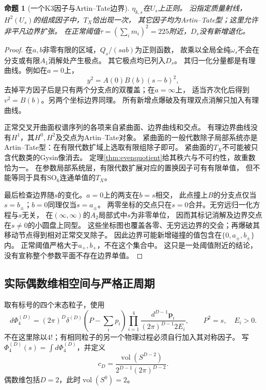 \documentclass[11pt,a4paper]{ctexart}
\theoremstyle{cnplain}\newtheorem{theorem}{定理}[section]
\newtheorem{proposition}[theorem]{命题}
\theoremstyle{definition}\newtheorem{definition}[theorem]{定义}
\theoremstyle{remark}\newtheorem{remark}[theorem]{注}
\begin{document}
\begin{proposition}[一个K3因子与Artin--Tate边界]\label{prop:evenboundary}
$\eta_{k,s}$在$U_s$上正则。
沿指定质量射线，$H^2(U_s)$的组成因子中，$T_X$恰出现一次，
其它因子均为Artin--Tate型；这里允许非平凡边界扩张。
在正常阈值$\tau=(\sum_i m_i)^2=225$附近，$D_s$没有新增退化。
\end{proposition}
\begin{proof}
在$a,b$非零有限的区域，$Q_s/(sab)$为正则函数，
故乘以全局全纯$\omega_s$不会在分支或有限$A_1$消解处产生极点。
其它极点均已列入$D_s$。
其归一化分量都是有理曲线。例如在$a=0$上，
\[
 y^2=A(0)B(b)(s-b)^2,
\]
去掉平方因子后是只有两个分支点的双覆盖；在$a=\infty$上，
适当齐次化后得到$v^2=B(b)$。另两个坐标边界同理。
所有新增点爆破及有理双点消解只加入有理曲线。

正常交叉开曲面权谱序列的各项来自紧曲面、边界曲线和交点。
有理边界曲线没有$H^1$，其$H^0,H^2$及交点为Artin--Tate对象。
紧曲面的一般代数除子局部系统亦是Artin--Tate型：在有限代数扩域上选取有限组除子即可。
紧曲面的$T_X$不可能被只含代数类的Gysin像消去。
定理\ref{thm:evenquotient}给其秩六与不可约性，故重数恰为一。
在参数局部系统层，有限代数扩展对应的置换因子可有有限单值，
但不能等同于具有$\mathrm{SO}_6$连通单值的$T_X$。

最后检查边界随$s$的变化。$a=0$上的两支在$b=s$相交，
此点撞上$B$的分支点仅当$s=b_\pm$；$b=0$同理仅当$s=a_\pm$。
两零坐标的交点只在$s=0$合并。无穷远归一化方程与$s$无关，
在$(\infty,\infty)$的$A_2$局部式中$s$为非零单位，
因而其标记消解及边界交点在$s\ne0$的小圆盘上同型。
这些坐标图也覆盖各零、无穷远边界的交会；再爆破其移动节点得到相对正常交叉除子。
因此边界可能新增碰撞的值包含在$\{0,a_\pm,b_\pm\}$内。
正常阈值严格大于$a_+,b_+$，不在这个集合中。
这只是一处阈值附近的结论，没有宣称整个参数平面不存在边界单值。
\end{proof}

\subsection{实际偶数维相空间与严格正周期}
取有标号的四个末态粒子，使用
\[
 d\Phi_4^{(D)}=(2\pi)^D\delta^{(D)}(P-\textstyle\sum_i p_i)
       \prod_{i=1}^4\frac{d^{D-1}\mathbf p_i}{(2\pi)^{D-1}2E_i},
 \qquad P^2=s,\quad E_i>0.
\]
不在这里除以$4!$；有相同粒子的另一个物理过程必须自行加入其对称因子。
写$\Phi_4^{(D)}(s)=\int d\Phi_4^{(D)}$，并定义
\[
 c_D=\frac{\operatorname{vol}(S^{D-2})}{2^{D-1}(2\pi)^{D-2}}.
\]
偶数维包括$D=2$，此时$\operatorname{vol}(S^0)=2$。
\end{document}
